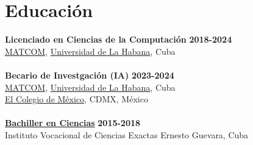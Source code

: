\documentclass{article}
\begin{document}
\section*{Educación}
\textbf{Licenciado en Ciencias de la Computación} \hfill  \textbf{2018-2024}\\
\href{https://matcom.in/}{MATCOM}, \href{https://uh.cu}{Universidad de La Habana}, Cuba\\
\vspace{0.1cm}\\
\textbf{Becario de Investgaci\'on (IA)} \hfill \textbf{2023-2024}\\
\href{https://matcom.in/}{MATCOM}, \href{https://uh.cu}{Universidad de La Habana}, Cuba\\
\href{https://www.colmex.mx/}{El Colegio de M\'exico}, CDMX, M\'exico\\
\vspace{0.1cm}\\
\textbf{\hyperref[sec:bachelor]{Bachiller en Ciencias}} \hfill \textbf{2015-2018}\\
Instituto Vocacional de Ciencias Exactas Ernesto Guevara, Cuba
\end{document}
